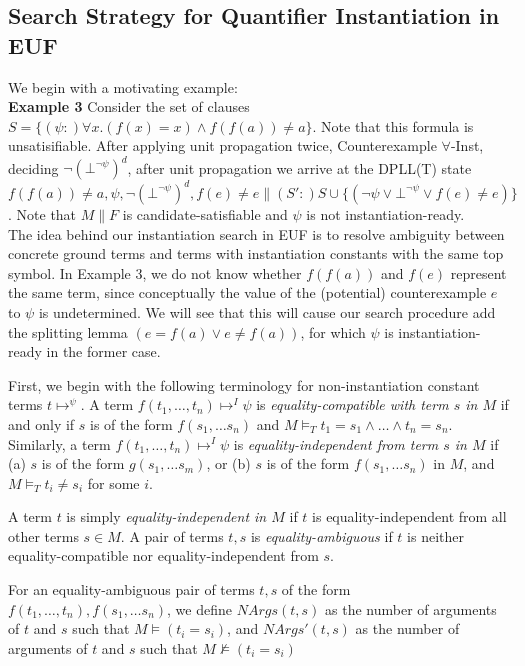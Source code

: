 \documentclass{llncs}
\begin{document}
\subsection{Search Strategy for Quantifier Instantiation in EUF}

We begin with a motivating example: \\

{\bf Example 3}
Consider the set of clauses $S = \{ (\psi :)\forall x. (f( x ) = x) \wedge f( f( a ) ) \neq a \}$.  Note that this formula is unsatisifiable.
After applying unit propagation twice, Counterexample $\forall$-Inst, deciding $\neg (\bot^{\neg \psi})^d$, after unit propagation we arrive at the DPLL(T) state $f( f( a ) ) \neq a, \psi, \neg (\bot^{\neg \psi})^d, f(e) \neq e \parallel (S':)S \cup \{ ( \neg \psi \vee \bot^{\neg \psi } \vee f( e ) \neq e ) \}$.
Note that $M \parallel F$ is candidate-satisfiable and $\psi$ is not instantiation-ready. \\

The idea behind our instantiation search in EUF is to resolve ambiguity between concrete ground terms and terms with instantiation constants with the same top symbol.
In Example 3, we do not know whether $f( f( a ) )$ and $f( e )$ represent the same term, since conceptually the value of the (potential) counterexample $e$ to $\psi$ is undetermined.
We will see that this will cause our search procedure add the splitting lemma $( e = f( a ) \vee e \neq f( a ) )$, for which $\psi$ is instantiation-ready in the former case.

First, we begin with the following terminology for non-instantiation constant terms $t \mapsto^ \psi$.
A term $f( t_1, \ldots, t_n ) \mapsto^I \psi$ is \emph{equality-compatible with term $s$ in $M$} if and only if $s$ is of the form $f( s_1, \ldots s_n )$ and $M \models_T t_1 = s_1 \wedge \ldots \wedge t_n = s_n$.
Similarly, a term $f( t_1, \ldots, t_n ) \mapsto^I \psi$ is \emph{equality-independent from term $s$ in $M$} if (a) $s$ is of the form $g( s_1, \ldots s_m )$, or (b) $s$ is of the form $f( s_1, \ldots s_n )$ in $M$, and $M \models_T t_i \neq s_i$ for some $i$. 

A term $t$ is simply \emph{equality-independent in $M$} if $t$ is equality-independent from all other terms $s \in M$.  
A pair of terms $t, s$ is \emph{equality-ambiguous} if $t$ is neither equality-compatible nor equality-independent from $s$.

For an equality-ambiguous pair of terms $t, s$ of the form $f( t_1, \ldots, t_n ), f( s_1, \ldots s_n )$, we define $NArgs( t, s )$ as the number of arguments of $t$ and $s$ such that $M \models (t_i = s_i)$, and $NArgs'( t, s )$ as the number of arguments of $t$ and $s$ such that $M \not\models (t_i = s_i)$
\end{document}
